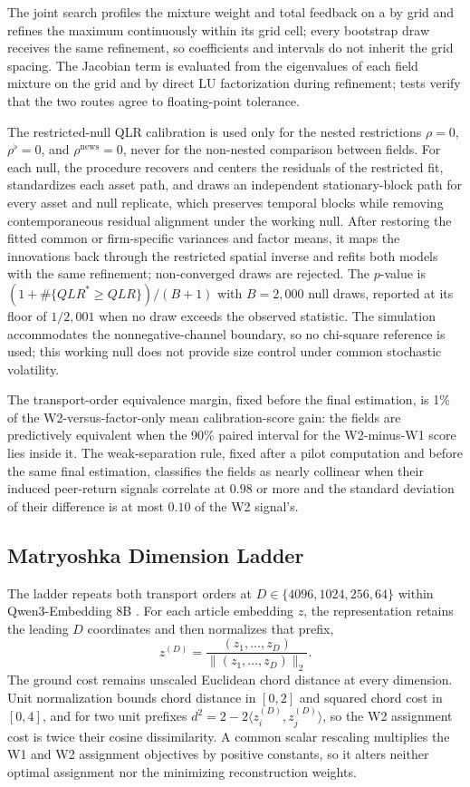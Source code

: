 The joint search profiles the mixture weight and total feedback on a
 by  grid and
refines the maximum continuously within its grid cell; every bootstrap draw
receives the same refinement, so coefficients and intervals do not inherit the
grid spacing.
The Jacobian term is evaluated from the eigenvalues of each field mixture on
the grid and by direct LU factorization during refinement; tests verify that
the two routes agree to floating-point tolerance.

The restricted-null QLR calibration is used only for the nested restrictions
$\rho=0$, $\rho^\flat=0$, and $\rho^{\mathrm{news}}=0$, never for the
non-nested comparison
between fields.
For each null, the procedure recovers and centers the residuals of the
restricted fit, standardizes each asset path, and draws an independent
stationary-block path for every asset and null replicate, which preserves
temporal blocks while removing contemporaneous residual alignment under the
working null.
After restoring the fitted common or firm-specific variances and factor means,
it maps the innovations back through the restricted spatial inverse and refits
both models with the same refinement; non-converged draws are rejected.
The $p$-value is $(1+\#\{QLR^*\geq QLR\})/(B+1)$ with $B=2{,}000$ null draws,
reported at its floor of $1/2{,}001$ when no draw exceeds the observed
statistic.
The simulation accommodates the nonnegative-channel boundary, so no chi-square
reference is used; this working null does not provide size control under
common stochastic volatility.

The transport-order equivalence margin, fixed before the final estimation, is
1\% of the W2-versus-factor-only mean calibration-score gain: the fields are
predictively equivalent when the 90\% paired interval for the W2-minus-W1
score lies inside it.
The weak-separation rule, fixed after a pilot computation and before the same
final estimation, classifies the fields as nearly collinear when their induced
peer-return signals correlate at $0.98$ or more and the standard deviation of
their difference is at most $0.10$ of the W2 signal's.

\subsection{Matryoshka Dimension Ladder}
\label{sec:p5-matryoshka}

The ladder repeats both transport orders at $D\in\{4096,1024,256,64\}$ within
Qwen3-Embedding 8B \citep{kusupati_matryoshka_2022,qwen3_embedding_2025}.
For each article embedding $z$, the representation retains the leading $D$
coordinates and then normalizes that prefix,
\[
  z^{(D)}=\frac{(z_1,\ldots,z_D)}{\lVert(z_1,\ldots,z_D)\rVert_2}.
\]
The ground cost remains unscaled Euclidean chord distance at every dimension.
Unit normalization bounds chord distance in $[0,2]$ and squared chord cost in
$[0,4]$, and for two unit prefixes $d^2=2-2\langle z_i^{(D)},z_j^{(D)}\rangle$,
so the W2 assignment cost is twice their cosine dissimilarity.
A common scalar rescaling multiplies the W1 and W2 assignment objectives by
positive constants, so it alters neither optimal assignment nor the minimizing
reconstruction weights.

